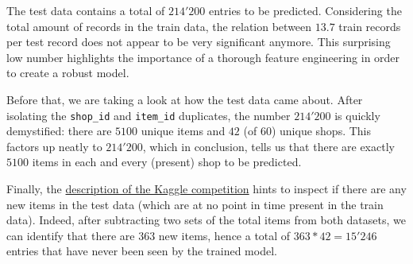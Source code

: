 The test data contains a total of $214'200$ entries to be predicted. Considering the total amount of records in the train data, the relation between $13.7$ train records per test record does not appear to be very significant anymore. This surprising low number highlights the importance of a thorough feature engineering in order to create a robust model.

Before that, we are taking a look at how the test data came about. After isolating the \texttt{shop\_id} and \texttt{item\_id} duplicates, the number $214'200$ is quickly demystified: there are $5100$ unique items and $42$ (of $60$) unique shops. This factors up neatly to $214'200$, which in conclusion, tells us that there are exactly $5100$ items in each and every (present) shop to be predicted.

Finally, the \href{https://www.kaggle.com/c/competitive-data-science-predict-future-sales/data}{description of the Kaggle competition} hints to inspect if there are any new items in the test data (which are at no point in time present in the train data). Indeed, after subtracting two sets of the total items from both datasets, we can identify that there are $363$ new items, hence a total of $363*42=15'246$ entries that have never been seen by the trained model.

